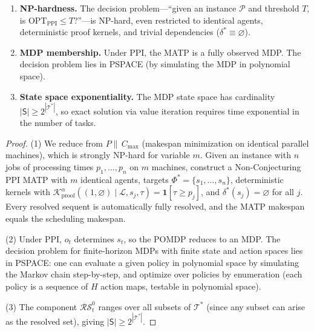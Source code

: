 \begin{theorem}\label{thm:complexity}
\leavevmode
\begin{enumerate}
    \item \textbf{NP-hardness.} The decision problem---``given an instance $\mathcal{P}$ and threshold $T$, is $\mathrm{OPT}_{\mathrm{PPI}} \le T$?''---is NP-hard, even restricted to identical agents, deterministic proof kernels, and trivial dependencies ($\delta^*\equiv\varnothing$).
    
    \item \textbf{MDP membership.} Under PPI, the MATP is a fully observed MDP. The decision problem lies in PSPACE (by simulating the MDP in polynomial space).
    
    \item \textbf{State space exponentiality.} The MDP state space has cardinality $|\mathsf{S}| \ge 2^{|\mathcal{T}^*|}$, so exact solution via value iteration requires time exponential in the number of tasks.
\end{enumerate}
\end{theorem}

\begin{proof}
(1) We reduce from $P\|\, C_{\max}$ (makespan minimization on identical parallel machines), which is strongly NP-hard for variable $m$. Given an instance with $n$ jobs of processing times $p_1,\ldots,p_n$ on $m$ machines, construct a Non-Conjecturing PPI MATP with $m$ identical agents, targets $\Phi^* = \{s_1,\ldots,s_n\}$, deterministic kernels with $\mathcal{K}^\alpha_{\mathrm{proof}}((1,\varnothing)\mid\mathcal{L},s_j,\tau) = \mathbf{1}[\tau\ge p_j]$, and $\delta^*(s_j) = \varnothing$ for all $j$. Every resolved sequent is automatically fully resolved, and the MATP makespan equals the scheduling makespan.

(2) Under PPI, $o_t$ determines $s_t$, so the POMDP reduces to an MDP. The decision problem for finite-horizon MDPs with finite state and action spaces lies in PSPACE: one can evaluate a given policy in polynomial space by simulating the Markov chain step-by-step, and optimize over policies by enumeration (each policy is a sequence of $H$ action maps, testable in polynomial space).

(3) The component $\mathcal{RS}^0_t$ ranges over all subsets of $\mathcal{T}^*$ (since any subset can arise as the resolved set), giving $|\mathsf{S}| \ge 2^{|\mathcal{T}^*|}$.
\end{proof}

